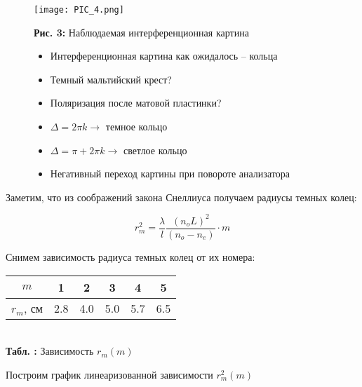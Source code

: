 \documentclass{beamer}
\newcounter{picture}
\newcounter{tbl}
\newcommand{\embedtbl}[3]{\begin{center}
		\begin{tabular}{#1}
			#2
		\end{tabular}
		\\\textbf{Табл. \thetbl:} #3
		\label{tbl_\thetbl}
		\addtocounter{tbl}{1}
\end{center}}
\begin{document}
	\begin{frame}
		\begin{figure}[h]
			\begin{minipage}{0.3\linewidth}
				\begin{center}
					\texttt{[image: PIC\_4.png]}
				\end{center}
				\textbf{Рис. 3:} Наблюдаемая интерференционная картина
			\end{minipage}
			\begin{minipage}{0.6\linewidth}
				\begin{itemize}
					\item Интерференционная картина как ожидалось -- кольца
					\item Темный мальтийский крест?
					\item Поляризация после матовой пластинки?
					\item $\Delta = 2\pi k \longrightarrow$ темное кольцо
					\item $\Delta = \pi + 2\pi k \longrightarrow$ светлое кольцо
					\item Негативный переход картины при повороте анализатора
				\end{itemize}
			\end{minipage}
		\end{figure}
	\end{frame}

	\begin{frame}
		Заметим, что из соображений закона Снеллиуса получаем радиусы темных колец:
		
		$$ r_m^2 = \frac{\lambda}{l} \frac{(n_oL)^2}{(n_o - n_e)} \cdot m $$
		
		Снимем зависимость радиуса темных колец от их номера:
		
		\embedtbl{|c|c|c|c|c|c|}{
			\hline
			$m$ & 1 & 2 & 3 & 4 & 5
			\\\hline
			$r_m$, см & 2.8 & 4.0 & 5.0 & 5.7 & 6.5
			\\\hline
		}{Зависимость $r_m(m)$}
	
		Построим график линеаризованной зависимости $r_m^2(m)$
	\end{frame}
\end{document}

